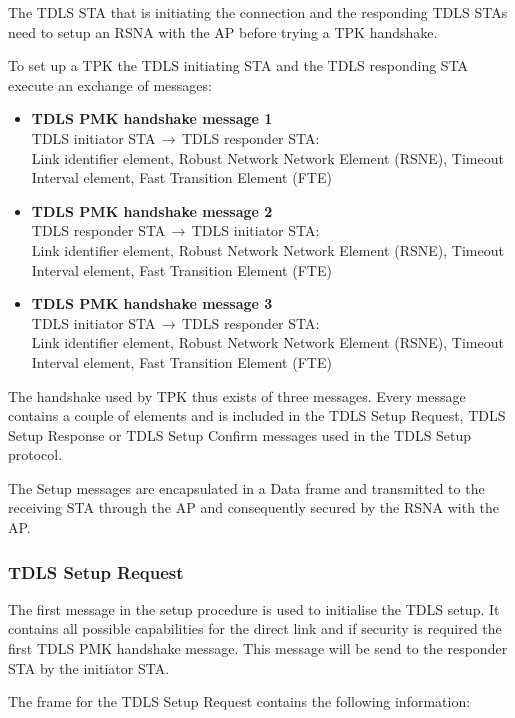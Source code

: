 The TDLS STA that is initiating the connection and the responding TDLS STAs need to setup an RSNA with the AP before trying a TPK handshake. 

To set up a TPK the TDLS initiating STA and the TDLS responding STA execute an exchange of messages:

\begin{itemize}
	\item[] \textbf{TDLS PMK handshake message 1}\\ TDLS initiator STA$\,\to\,$TDLS responder STA:\\
	Link identifier element, Robust Network Network Element (RSNE), Timeout Interval element, Fast Transition Element (FTE)
	\item[] \textbf{TDLS PMK handshake message 2}\\ TDLS responder STA$\,\to\,$TDLS initiator STA:\\
	Link identifier element, Robust Network Network Element (RSNE), Timeout Interval element, Fast Transition Element (FTE)
	\item[] \textbf{TDLS PMK handshake message 3}\\ TDLS initiator STA$\,\to\,$TDLS responder STA:\\
	Link identifier element, Robust Network Network Element (RSNE), Timeout Interval element, Fast Transition Element (FTE)
\end{itemize}

The handshake used by TPK thus exists of three messages. Every message contains a couple of elements and is included in the TDLS Setup Request, TDLS Setup Response or TDLS Setup Confirm messages used in the TDLS Setup protocol.

The Setup messages are encapsulated in a Data frame and transmitted to the receiving STA through the AP and consequently secured by the RSNA with the AP.

\subsubsection{TDLS Setup Request}

The first message in the setup procedure is used to initialise the TDLS setup. It contains all possible capabilities for the direct link and if security is required the first TDLS PMK handshake message.  This message will be send to the responder STA by the initiator STA.

The frame for the TDLS Setup Request contains the following information:

